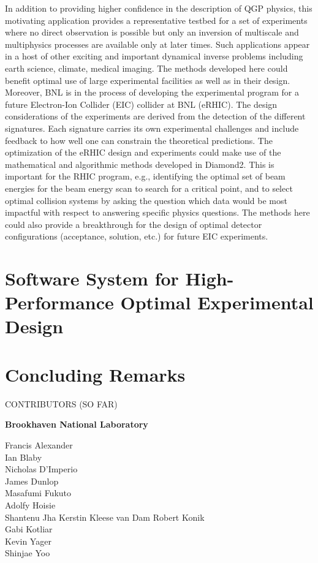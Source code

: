\documentclass[11pt]{article}
\begin{document}
 In addition to providing higher confidence in the
description of QGP physics, this motivating application provides a
representative testbed for a set of experiments where no direct
observation is possible but only an inversion of multiscale and
multiphysics processes are available only at later times.  Such
applications appear in a host of other exciting and important
dynamical inverse problems including earth science, climate, medical
imaging. The methods developed here could benefit optimal use of large
experimental facilities as well as in their design.  Moreover, BNL is
in the process of developing the experimental program for a future
Electron-Ion Collider (EIC) collider at BNL (eRHIC). The design
considerations of the experiments are derived from the detection of
the different signatures. Each signature carries its own experimental
challenges and include feedback to how well one can constrain the
theoretical predictions.  The optimization of the eRHIC design and
experiments could make use of the mathematical and algorithmic methods
developed in Diamond2.  This is important for the RHIC program, e.g.,
identifying the optimal set of beam energies for the beam energy scan
to search for a critical point, and to select optimal collision
systems by asking the question which data would be most impactful with
respect to answering specific physics questions.  The methods here
could also provide a breakthrough for the design of optimal detector
configurations (acceptance, solution, etc.) for future EIC
experiments.




\section{Software System for High-Performance Optimal Experimental Design}

\section{Concluding Remarks}

\newpage



\begin{center}
CONTRIBUTORS (SO FAR)
\end{center}

\bf{Brookhaven National Laboratory}

Francis Alexander \\
Ian Blaby\\
Nicholas D'Imperio\\
James Dunlop\\
Masafumi Fukuto\\
Adolfy Hoisie\\
Shantenu Jha
Kerstin Kleese van Dam
Robert Konik\\
Gabi Kotliar\\
Kevin Yager\\
Shinjae Yoo\\
 
\end{document}
